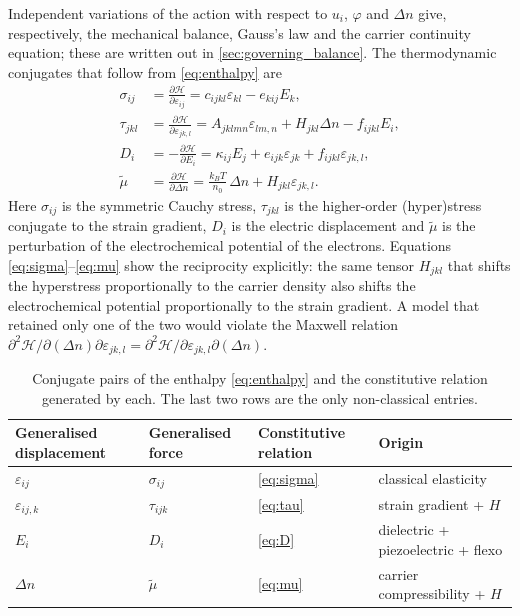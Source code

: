 Independent variations of the action with respect to $u_i$, $\varphi$ and
$\Delta n$ give, respectively, the mechanical balance, Gauss's law and the
carrier continuity equation; these are written out in
\cref{sec:governing_balance}.  The thermodynamic
conjugates that follow from \eqref{eq:enthalpy} are
\begin{align}
\sigma_{ij}&=\frac{\partial\mathcal{H}}{\partial\varepsilon_{ij}}
=c_{ijkl}\varepsilon_{kl}-e_{kij}E_k,
\label{eq:sigma}\\
\tau_{jkl}&=\frac{\partial\mathcal{H}}{\partial\varepsilon_{jk,l}}
=A_{jklmn}\varepsilon_{lm,n}+H_{jkl}\Delta n-f_{ijkl}E_i,
\label{eq:tau}\\
D_i&=-\frac{\partial\mathcal{H}}{\partial E_i}
=\kappa_{ij}E_j+e_{ijk}\varepsilon_{jk}+f_{ijkl}\varepsilon_{jk,l},
\label{eq:D}\\
\widetilde\mu&=\frac{\partial\mathcal{H}}{\partial\Delta n}
=\frac{k_BT}{n_0}\,\Delta n+H_{jkl}\varepsilon_{jk,l}.
\label{eq:mu}
\end{align}
Here $\sigma_{ij}$ is the symmetric Cauchy stress, $\tau_{jkl}$ is the
higher-order (hyper)stress conjugate to the strain gradient, $D_i$ is the
electric displacement and $\widetilde\mu$ is the perturbation of the
electrochemical potential of the electrons.  Equations
\eqref{eq:sigma}--\eqref{eq:mu} show the reciprocity explicitly: the same
tensor $H_{jkl}$ that shifts the hyperstress proportionally to the carrier
density also shifts the electrochemical potential proportionally to the strain
gradient.  A model that retained only one of the two would violate the
Maxwell relation $\partial^2\mathcal{H}/\partial(\Delta n)\partial
\varepsilon_{jk,l}=\partial^2\mathcal{H}/\partial\varepsilon_{jk,l}\partial
(\Delta n)$.

\begin{table}[t]
\centering
\caption{Conjugate pairs of the enthalpy \eqref{eq:enthalpy} and the
constitutive relation generated by each.  The last two rows are the only
non-classical entries.}
\label{tab:conjugates}
\begin{tabular}{@{}llll@{}}
\toprule
Generalised displacement & Generalised force & Constitutive relation & Origin \\
\midrule
$\varepsilon_{ij}$ & $\sigma_{ij}$ & \cref{eq:sigma} & classical elasticity \\
$\varepsilon_{ij,k}$ & $\tau_{ijk}$ & \cref{eq:tau} & strain gradient + $H$ \\
$E_i$ & $D_i$ & \cref{eq:D} & dielectric + piezoelectric + flexo \\
$\Delta n$ & $\widetilde\mu$ & \cref{eq:mu} & carrier compressibility + $H$ \\
\bottomrule
\end{tabular}
\end{table}

